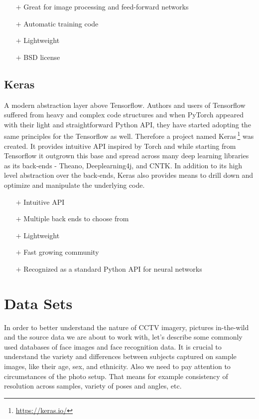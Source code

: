 \begin{itemize}
    \item[$\boldsymbol{+}$] Great for image processing and feed-forward networks
    \item[$\boldsymbol{+}$] Automatic training code
    \item[$\boldsymbol{+}$] Lightweight
    \item[$\boldsymbol{+}$] BSD license
\end{itemize}

\subsection{Keras}

A modern abstraction layer above Tensorflow. Authors and users of Tensorflow suffered from heavy and complex code structures and when PyTorch appeared with their light and straightforward Python API, they have started adopting the same principles for the Tensorflow as well. Therefore a project named Keras\,\footnote{\url{https://keras.io/}} was created. It provides intuitive API inspired by Torch and while starting from Tensorflow it outgrown this base and spread across many deep learning libraries as its back-ends - Theano, Deeplearning4j, and CNTK. In addition to its high level abstraction over the back-ends, Keras also provides means to drill down and optimize and manipulate the underlying code.

\begin{itemize}
    \item[$\boldsymbol{+}$] Intuitive API
    \item[$\boldsymbol{+}$] Multiple back ends to choose from
    \item[$\boldsymbol{+}$] Lightweight
    \item[$\boldsymbol{+}$] Fast growing community
    \item[$\boldsymbol{+}$] Recognized as a standard Python API for neural networks
\end{itemize}

\section{Data Sets}

In order to better understand the nature of CCTV imagery, pictures in-the-wild and the source data we are about to work with, let's describe some commonly used databases of face images and face recognition data. It is crucial to understand the variety and differences between subjects captured on sample images, like their age, sex, and ethnicity. Also we need to pay attention to circumstances of the photo setup. That means for example consistency of resolution across samples, variety of poses and angles, etc.

